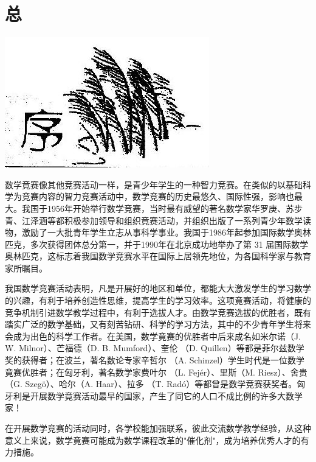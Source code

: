 \documentclass[10pt]{article}
\begin{document}
\section*{总}
\begin{center}
\includegraphics[max width=\textwidth]{2024_10_30_2c8f45efd4a519b08e1ag-003}
\end{center}

数学竟赛像其他竞赛活动一样，是青少年学生的一种智力竞赛。在类似的以基础科学为竞赛内容的智力竞赛活动中，数学竞赛的历史最悠久、国际性强，影响也最大。我国于1956年开始举行数学竞赛，当时最有威望的著名数学家华罗庚、苏步青、江泽涵等都积极参加领导和组织竟赛活动，并组织出版了一系列青少年数学读物，激励了一大批青年学生立志从事科学事业。我国于1986年起参加国际数学奥林匹克，多次获得团体总分第一，并于1990年在北京成功地举办了第 31 届国际数学奥林匹克，这标志着我国数学竞赛水平在国际上居领先地位，为各国科学家与教育家所瞩目。

我国数学竞赛活动表明，凡是开展好的地区和单位，都能大大激发学生的学习数学的兴趣，有利于培养创造性思维，提高学生的学习效率。这项竟赛活动，将健康的竞争机制引进数学教学过程中，有利于选拔人才。由数学竞赛选拔的优胜者，既有踏实广泛的数学基础，又有刻苦钻研、科学的学习方法，其中的不少青年学生将来会成为出色的科学工作者。在美国，数学竟赛的优胜者中后来成名如米尔诺（J. W. Milnor）、芒福德（D. B. Mumford）、奎伦 （D. Quillen）等都是菲尔兹数学奖的获得者；在波兰，著名数论专家辛哲尔 （A. Schinzel）学生时代是一位数学竟赛优胜者；在匈牙利，著名数学家费叶尔 （L. Fejér）、里斯（M. Riesz）、舍贵（G. Szegö）、哈尔（A. Haar）、拉多 （T. Radó）等都曾是数学竞赛获奖者。匈牙利是开展数学竟赛活动最早的国家，产生了同它的人口不成比例的许多大数学家！

在开展数学竞赛的活动同时，各学校能加强联系，彼此交流数学教学经验，从这种意义上来说，数学竟赛可能成为数学课程改革的"催化剂"，成为培养优秀人才的有力措施。
\end{document}
